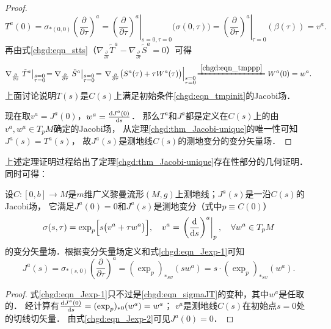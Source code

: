 \begin{proof}
    \begin{equation*}
        T^a(0)=\sigma_{*(0,0)}\left(\frac{\partial}{\partial \tau}\right)^a
        = \left.\left(\frac{\partial}{\partial \tau}\right)^a  \right|_{s=0,\tau=0} \bigl(\sigma(0,\tau)\bigr)
        = \left.\left(\frac{\partial}{\partial \tau}\right)^a  \right|_{\tau=0}\left(\beta(\tau)\right) = v^a.
    \end{equation*}
    再由式\eqref{chgd:eqn_stts}（$ \nabla_{\frac{\partial}{\partial s}}\tilde{T}^a
    - \nabla_{\frac{\partial}{\partial \tau}}\tilde{S}^a =0$）可得
    \begin{equation*}
        \nabla_{\frac{\partial}{\partial s}} \left.\tilde{T}^a \right|_{\substack{s=0\\ \tau=0}} \!
        =\nabla_{\frac{\partial}{\partial \tau}} \left.\tilde{S}^a \right|_{\substack{s=0\\ \tau=0}} \!
        =\left. \nabla_{\frac{\partial}{\partial \tau}}\bigl(S^a(\tau)+ \tau W^a(\tau) \bigr)
         \right|_{\substack{s=0\\ \tau=0}}\! \xlongequal{\ref{chgd:eqn_tmppp}} W^a(0) =w^a .
    \end{equation*}
    上面讨论说明$T(s)$是$C(s)$上满足初始条件\eqref{chgd:eqn_tmpinit}的Jacobi场．

    现在取$v^a=J^a(0)$，$w^a=\frac{{\rm d}J^a(0)}{{\rm d} s}$．
    那么$T^a$和$J^a$都是定义在$C(s)$上的由$v^a,w^a\in T_pM$确定的Jacobi场，
    从定理\ref{chgd:thm_Jacobi-unique}的唯一性可知$J^a(s)=T^a(s)$，
    故$J^a(s)$是测地线$C(s)$的测地变分的变分矢量场．
\end{proof}

上述定理证明过程给出了定理\ref{chgd:thm_Jacobi-unique}存在性部分的几何证明．
同时可得：
\begin{corollary}\label{chgd:thm_Jexp}
    设$C:[0,b]\to M$是$m$维广义黎曼流形$(M,g)$上测地线；$J^a(s)$是一沿$C(s)$的Jacobi场，
    它满足$J^a(0)=0$和$J^a(s)$是测地变分（式中$p\equiv C(0)$）
    \begin{equation}\label{chgd:eqn_Jexp-1}
        \sigma(s,\tau)= \exp_{p}\Bigl[s\bigl(v^a+\tau w^a\bigr)\Bigr],
        \quad v^a = \left.\left(\frac{\rm{d}}{{\rm d} s}\right)^a \right|_{p},
        \quad \forall w^a \in T_{p} M 
    \end{equation}
    的变分矢量场．根据变分矢量场定义和式\eqref{chgd:eqn_Jexp-1}可知
    \begin{equation}\label{chgd:eqn_Jexp-2}
        J^a(s)= \sigma_{*(s,0)}\left(\frac{\partial}{\partial \tau}\right)^a
        =  (\exp_{p})_{* s v} (sw^a) =s\cdot (\exp_{p})_{* s v} ( w^a) .
    \end{equation}    
\end{corollary}
\begin{proof}
    式\eqref{chgd:eqn_Jexp-1}只不过是\eqref{chgd:eqn_sigmaJT}的变种，其中$w^a$是任取的．
    经计算有$\frac{{\rm d}J^a(0)}{{\rm d}s} =(\exp_{p})_{* 0} ( w^a)  =w^a$；
    $v^a$是测地线$C(s)$在初始点$s=0$处的切线切矢量．
    由式\eqref{chgd:eqn_Jexp-2}可见$J^a(0)=0$．
\end{proof}



